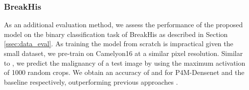 \documentclass{llncs}
\begin{document}
\subsubsection{BreakHis} 
As an additional evaluation method, we assess the performance of the proposed model on the binary classification task of BreakHis as described in Section \ref{ssec:data_eval}. As training the model from scratch is impractical given the small dataset, we pre-train on Camelyon16 at a similar pixel resolution. Similar to \cite{Spanhol2016-dm}, we predict the malignancy of a test image by using the maximum activation of 1000 random crops. We obtain an accuracy of  and  for P4M-Densenet and the baseline respectively, outperforming previous approaches \cite{Spanhol2016-dm}\cite{Songyang}. 










    
    
    



    




















    
























    



    



    
    




    
\end{document}
